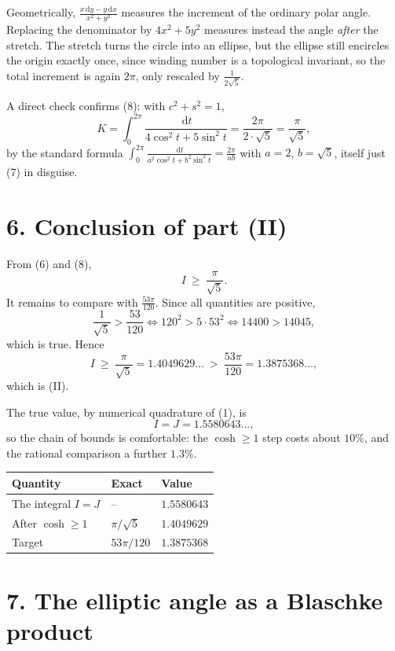 \documentclass[12pt]{article}
\newcommand{\dd}{\,\mathrm{d}}
\begin{document}
Geometrically, \(\frac{x\dd y-y\dd x}{x^2+y^2}\) measures the increment of
the ordinary polar angle. Replacing the denominator by \(4x^2+5y^2\)
measures instead the angle \emph{after} the stretch. The stretch turns
the circle into an ellipse, but the ellipse still encircles the origin
exactly once, since winding number is a topological invariant, so the
total increment is again \(2\pi\), only rescaled by
\(\frac1{2\sqrt5}\).

A direct check confirms (8): with \(c^2+s^2=1\),
\[
K=\int_0^{2\pi}\frac{\dd t}{4\cos^2t+5\sin^2t}
=\frac{2\pi}{2\cdot\sqrt5}=\frac{\pi}{\sqrt5},
\]
by the standard formula
\(\int_0^{2\pi}\frac{\dd t}{a^2\cos^2t+b^2\sin^2t}=\frac{2\pi}{ab}\)
with \(a=2\), \(b=\sqrt5\), itself just (7) in disguise.

\section*{6. Conclusion of part (II)}

From (6) and (8),
\[
I\ \ge\ \frac{\pi}{\sqrt5}.
\]
It remains to compare with \(\frac{53\pi}{120}\). Since all quantities
are positive,
\[
\frac1{\sqrt5}>\frac{53}{120}
\iff
120^2>5\cdot53^2
\iff
14400>14045,
\]
which is true. Hence
\[
\boxed{\displaystyle
I\ \ge\ \frac{\pi}{\sqrt5}=1.4049629\ldots
\ >\ \frac{53\pi}{120}=1.3875368\ldots,}
\]
which is (II).

The true value, by numerical quadrature of (1), is
\[
I=J=1.5580643\ldots,
\]
so the chain of bounds is comfortable: the \(\cosh\ge1\) step costs about
\(10\%\), and the rational comparison a further \(1.3\%\).

\begin{center}
\small
\renewcommand{\arraystretch}{1.35}
\begin{tabularx}{0.86\textwidth}{@{}Xll@{}}
\toprule
Quantity & Exact & Value \\
\midrule
The integral \(I=J\) & -- & \(1.5580643\) \\
After \(\cosh\ge1\) & \(\pi/\sqrt5\) & \(1.4049629\) \\
Target & \(53\pi/120\) & \(1.3875368\) \\
\bottomrule
\end{tabularx}
\end{center}

\section*{7. The elliptic angle as a Blaschke product}
\end{document}
